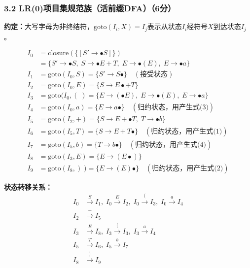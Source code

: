 \documentclass[12pt,a4paper,fontset=fandol]{ctexart}
\begin{document}
\subsubsection*{3.2 LR(0)项目集规范族（活前缀DFA）（6分）}

\textbf{约定：}大写字母为非终结符，$\text{goto}(I_i, X) = I_j$表示从状态$I_i$经符号$X$到达状态$I_j$。

\begin{align*}
I_0 &= \text{closure}(\{[S' \to \bullet S]\}) \\
    &= \{ S' \to \bullet S,\; S \to \bullet E + T,\; E \to \bullet (E),\; E \to \bullet a \} \\[4pt]
I_1 &= \text{goto}(I_0, S) = \{ S' \to S\bullet \} \quad (\text{接受状态}) \\[4pt]
I_2 &= \text{goto}(I_0, E) = \{ S \to E\bullet + T \} \\[4pt]
I_3 &= \text{goto}(I_0, (\;) = \{ E \to (\bullet E),\; E \to \bullet (E),\; E \to \bullet a \} \\[4pt]
I_4 &= \text{goto}(I_0, a) = \{ E \to a\bullet \} \quad (\text{归约状态，用产生式(3)}) \\[4pt]
I_5 &= \text{goto}(I_2, +) = \{ S \to E + \bullet T,\; T \to \bullet b \} \\[4pt]
I_6 &= \text{goto}(I_5, T) = \{ S \to E + T\bullet \} \quad (\text{归约状态，用产生式(1)}) \\[4pt]
I_7 &= \text{goto}(I_5, b) = \{ T \to b\bullet \} \quad (\text{归约状态，用产生式(4)}) \\[4pt]
I_8 &= \text{goto}(I_3, E) = \{ E \to (E\bullet) \} \\[4pt]
I_9 &= \text{goto}(I_8, )\;) = \{ E \to (E)\bullet \} \quad (\text{归约状态，用产生式(2)})
\end{align*}

\textbf{状态转移关系：}
\[
\begin{aligned}
I_0 &\xrightarrow{S} I_1,\; I_0 \xrightarrow{E} I_2,\; I_0 \xrightarrow{(} I_3,\; I_0 \xrightarrow{a} I_4 \\
I_2 &\xrightarrow{+} I_5 \\
I_3 &\xrightarrow{E} I_8,\; I_3 \xrightarrow{(} I_3,\; I_3 \xrightarrow{a} I_4 \\
I_5 &\xrightarrow{T} I_6,\; I_5 \xrightarrow{b} I_7 \\
I_8 &\xrightarrow{)} I_9
\end{aligned}
\]
\end{document}
